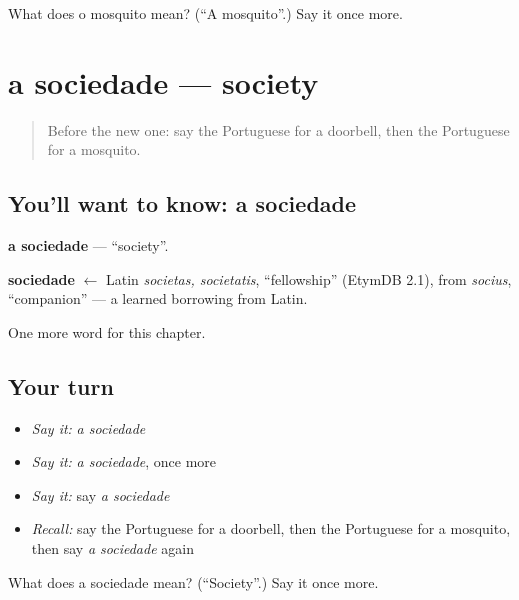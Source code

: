 \begin{tcolorbox}[breakable,colback=teal!4,colframe=teal!35!black,title={Before you move on}]
What does o mosquito mean? (\textquotedblleft{}A mosquito\textquotedblright{}.) Say it once more.
\end{tcolorbox}
\section[a sociedade]{a sociedade — society}

\label{lesson:PT-C158-sociedade}



\begin{quote}
Before the new one: say the Portuguese for a doorbell, then the Portuguese for a mosquito.
\end{quote}

\subsection*{You'll want to know: a sociedade}
\textbf{a sociedade} — \textquotedblleft{}society\textquotedblright{}.

\begin{cousinweb}
\textbf{sociedade} $\leftarrow$ Latin \emph{societas, societatis}, \textquotedblleft{}fellowship\textquotedblright{} (EtymDB 2.1), from \emph{socius}, \textquotedblleft{}companion\textquotedblright{} — a learned borrowing from Latin.
\end{cousinweb}

\begin{grammarlens}[title={What you've built}]
One more word for this chapter.
\end{grammarlens}

\subsection*{Your turn}
\begin{itemize}
\raggedright
  \item \emph{Say it:} \emph{a sociedade}
  \item \emph{Say it:} \emph{a sociedade}, once more
  \item \emph{Say it:} say \emph{a sociedade}
  \item \emph{Recall:} say the Portuguese for a doorbell, then the Portuguese for a mosquito, then say \emph{a sociedade} again
\end{itemize}

\begin{tcolorbox}[breakable,colback=teal!4,colframe=teal!35!black,title={Before you move on}]
What does a sociedade mean? (\textquotedblleft{}Society\textquotedblright{}.) Say it once more.
\end{tcolorbox}
